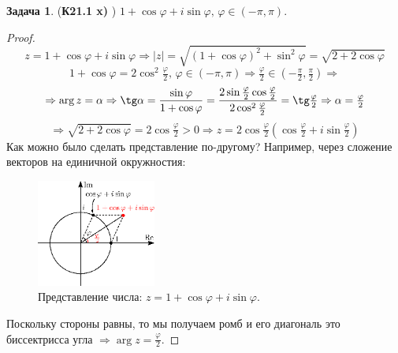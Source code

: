 \documentclass[12pt]{article}
\theoremstyle{definition}
\newtheorem{problem}{Задача}
\begin{document}
\begin{problem}(\textbf{К21.1 x) })
	$1 + \cos\varphi + i \sin\varphi, \, \varphi \in (-\pi,\pi)$.
\end{problem}
\begin{proof}
	$$
		z = 1 + \cos\varphi + i \sin\varphi \Rightarrow |z| = \sqrt{(1 + \cos\varphi)^2 + \sin^2\varphi} = \sqrt{2  + 2\cos\varphi}
	$$
	$$
		1 + \cos\varphi = 2\cos^2\tfrac{\varphi}{2}, \, \varphi \in (-\pi,\pi) \Rightarrow \tfrac{\varphi}{2} \in \left(-\tfrac{\pi}{2}, \tfrac{\pi}{2}\right) \Rightarrow
	$$
	$$
		\Rightarrow \arg{z}  = \alpha \Rightarrow \tg\alpha = \dfrac{\sin\varphi}{1 + \cos\varphi} = \dfrac{2\sin\tfrac{\varphi}{2}\cos\tfrac{\varphi}{2}}{2\cos^2\tfrac{\varphi}{2}} = \tg\tfrac{\varphi}{2} \Rightarrow \alpha = \tfrac{\varphi}{2}
	$$
	$$
		\Rightarrow \sqrt{2  + 2\cos\varphi} = 2\cos\tfrac{\varphi}{2} > 0 \Rightarrow z = 2\cos\tfrac{\varphi}{2}\left(\cos\tfrac{\varphi}{2} + i\sin\tfrac{\varphi}{2}\right)
	$$
	Как можно было сделать представление по-другому? Например, через сложение векторов на единичной окружностия:
	\begin{figure}[H]
		\centering
		\includegraphics[width=0.35\textwidth]{AL1S3_7.eps}
		\caption{Представление числа: $z = 1 + \cos\varphi + i \sin\varphi$.}
		\label{AL1S3_7}
	\end{figure}
 	Поскольку стороны равны, то мы получаем ромб и его диагональ это биссектрисса угла $\Rightarrow \arg z= \tfrac{\varphi}{2}$.
\end{proof}
\end{document}
